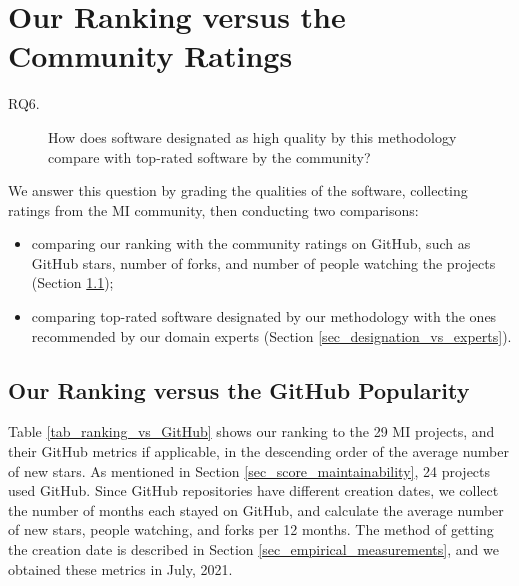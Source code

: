 \section{Our Ranking versus the Community Ratings}
\label{sec_rq_comparison}
\begin{description}
\item[RQ6.] How does software designated as high quality by this methodology compare with top-rated software by the community?
\end{description}

We answer this question by grading the qualities of the software, collecting ratings from the MI community, then conducting two comparisons:
\begin{itemize}
\item comparing our ranking with the community ratings on GitHub, such as GitHub stars, number of forks, and number of people watching the projects (Section \ref{sec_ranking_vs_github});
\item comparing top-rated software designated by our methodology with the ones recommended by our domain experts (Section \ref{sec_designation_vs_experts}).
\end{itemize}

\subsection{Our Ranking versus the GitHub Popularity}
\label{sec_ranking_vs_github}

Table \ref{tab_ranking_vs_GitHub} shows our ranking to the 29 MI projects, and their GitHub metrics if applicable, in the descending order of the average number of new stars. As mentioned in Section \ref{sec_score_maintainability}, 24 projects used GitHub. Since GitHub repositories have different creation dates, we collect the number of months each stayed on GitHub, and calculate the average number of new stars, people watching, and forks per 12 months. The method of getting the creation date is described in Section \ref{sec_empirical_measurements}, and we obtained these metrics in July, 2021.

